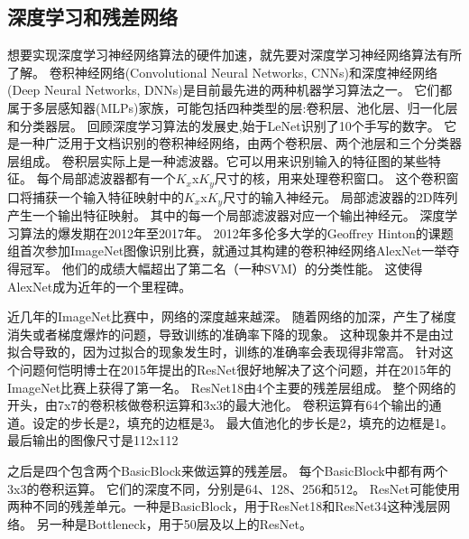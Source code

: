 \subsection{深度学习和残差网络}
想要实现深度学习神经网络算法的硬件加速，就先要对深度学习神经网络算法有所了解。
卷积神经网络(Convolutional Neural Networks, CNNs)\parencite{cnn1998}和深度神经网络(Deep Neural Networks, DNNs)\cite{dl2015}是目前最先进的两种机器学习算法之一。
它们都属于多层感知器(MLPs)家族，可能包括四种类型的层:卷积层、池化层、归一化层和分类器层\parencite{NN1998}。%
回顾深度学习算法的发展史,始于LeNet识别了10个手写的数字。
它是一种广泛用于文档识别的卷积神经网络，由两个卷积层、两个池层和三个分类器层组成。
卷积层实际上是一种滤波器。它可以用来识别输入的特征图的某些特征。
每个局部滤波器都有一个$K_x$x$K_y$尺寸的核，用来处理卷积窗口。
这个卷积窗口将捕获一个输入特征映射中的$K_x$x$K_y$尺寸的输入神经元。
局部滤波器的2D阵列产生一个输出特征映射。
其中的每一个局部滤波器对应一个输出神经元。
深度学习算法的爆发期在2012年至2017年。
2012年多伦多大学的Geoffrey Hinton的课题组首次参加ImageNet图像识别比赛，就通过其构建的卷积神经网络AlexNet\cite{alexnet2012}一举夺得冠军。
他们的成绩大幅超出了第二名（一种SVM）的分类性能。
这使得AlexNet成为近年的一个里程碑。


近几年的ImageNet比赛中，网络的深度越来越深。
随着网络的加深，产生了梯度消失或者梯度爆炸的问题，导致训练的准确率下降的现象。
这种现象并不是由过拟合导致的，因为过拟合的现象发生时，训练的准确率会表现得非常高。
针对这个问题何恺明博士在2015年提出的ResNet\parencite{resnet2015}很好地解决了这个问题，并在2015年的ImageNet比赛上获得了第一名。
ResNet18由4个主要的残差层组成。
整个网络的开头，由7x7的卷积核做卷积运算和3x3的最大池化。
卷积运算有64个输出的通道。设定的步长是2，填充的边框是3。
最大值池化的步长是2，填充的边框是1。
最后输出的图像尺寸是112x112

之后是四个包含两个BasicBlock来做运算的残差层。
每个BasicBlock中都有两个3x3的卷积运算。
它们的深度不同，分别是64、128、256和512。
ResNet可能使用两种不同的残差单元。一种是BasicBlock，用于ResNet18和ResNet34这种浅层网络。
另一种是Bottleneck，用于50层及以上的ResNet。

